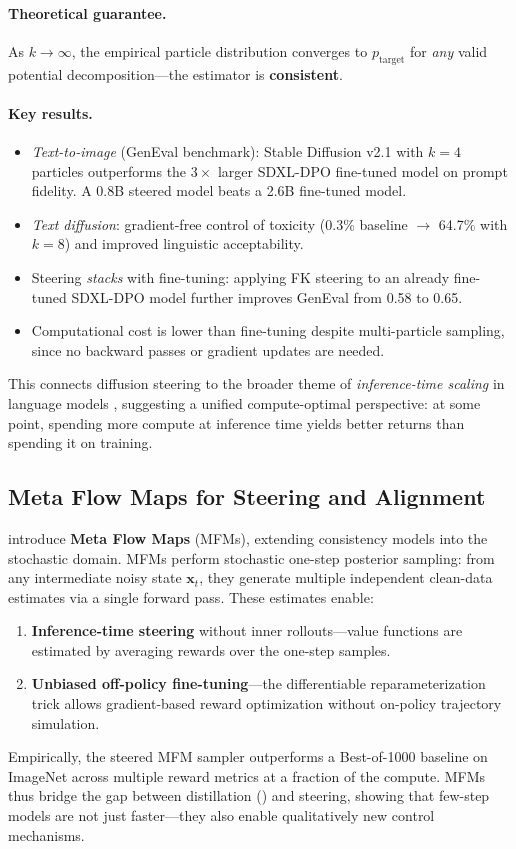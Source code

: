 \documentclass[11pt]{article}
\begin{document}
\paragraph{Theoretical guarantee.}
As $k \to \infty$, the empirical particle distribution converges to $p_{\mathrm{target}}$ for \emph{any} valid potential decomposition---the estimator is \textbf{consistent}.

\paragraph{Key results.}
\begin{itemize}
    \item \emph{Text-to-image} (GenEval benchmark): Stable Diffusion v2.1 with $k\!=\!4$ particles outperforms the $3\times$ larger SDXL-DPO fine-tuned model on prompt fidelity. A 0.8B steered model beats a 2.6B fine-tuned model.
    \item \emph{Text diffusion}: gradient-free control of toxicity (0.3\% baseline $\to$ 64.7\% with $k\!=\!8$) and improved linguistic acceptability.
    \item Steering \emph{stacks} with fine-tuning: applying FK steering to an already fine-tuned SDXL-DPO model further improves GenEval from 0.58 to 0.65.
    \item Computational cost is lower than fine-tuning despite multi-particle sampling, since no backward passes or gradient updates are needed.
\end{itemize}
This connects diffusion steering to the broader theme of \emph{inference-time scaling} in language models \citep{snell2024scaling}, suggesting a unified compute-optimal perspective: at some point, spending more compute at inference time yields better returns than spending it on training.

\subsection{Meta Flow Maps for Steering and Alignment}
\label{sec:mfm}

\citet{potaptchik2026meta} introduce \textbf{Meta Flow Maps} (MFMs), extending consistency models into the stochastic domain.
MFMs perform stochastic one-step posterior sampling: from any intermediate noisy state $\mathbf{x}_t$, they generate multiple independent clean-data estimates via a single forward pass.
These estimates enable:
\begin{enumerate}
    \item \textbf{Inference-time steering} without inner rollouts---value functions are estimated by averaging rewards over the one-step samples.
    \item \textbf{Unbiased off-policy fine-tuning}---the differentiable reparameterization trick allows gradient-based reward optimization without on-policy trajectory simulation.
\end{enumerate}
Empirically, the steered MFM sampler outperforms a Best-of-1000 baseline on ImageNet across multiple reward metrics at a fraction of the compute.
MFMs thus bridge the gap between distillation () and steering, showing that few-step models are not just faster---they also enable qualitatively new control mechanisms.
\end{document}
